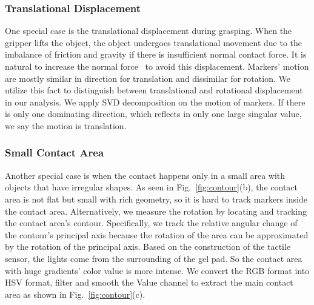 \subsubsection{Translational Displacement}
One special case is the translational displacement during grasping. When the gripper lifts the object, the object undergoes translational movement due to the imbalance of friction and gravity if there is insufficient normal contact force. It is natural to increase the normal force~\cite{shear-slip} to avoid this displacement. Markers' motion are mostly similar in direction for translation and dissimilar for rotation. We utilize this fact to distinguish between translational and rotational displacement in our analysis. We apply SVD decomposition on the motion of markers. If there is only one dominating direction, which reflects in only one large singular value, we say the motion is translation.

\subsubsection{Small Contact Area}
Another special case is when the contact happens only in a small area with objects that have irregular shapes. As seen in Fig.~\ref{fig:contour}(b), the contact area is not flat but small with rich geometry, so it is hard to track markers inside the contact area. Alternatively, we measure the rotation by locating and tracking the contact area's contour. Specifically, we track the relative angular change of the contour's principal axis because the rotation of the area can be approximated by the rotation of the principal axis. Based on the construction of the tactile sensor, the lights come from the surrounding of the gel pad. So the contact area with huge gradients' color value is more intense. We convert the RGB format into HSV format, filter and smooth the Value channel to extract the main contact area as shown in Fig.~\ref{fig:contour}(c).



